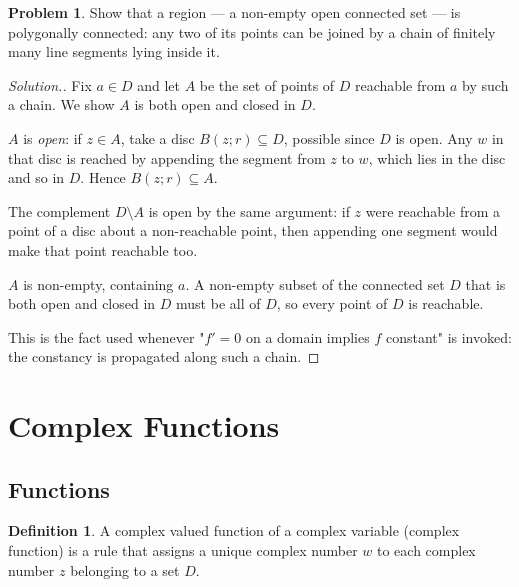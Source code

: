\documentclass[11pt,a4paper]{article}
\theoremstyle{definition}
\newtheorem{definition}[thm]{Definition}
\newtheorem{problemx}{Problem}[section]
\newenvironment{problem}{\begin{problemx}}{\end{problemx}}
\newenvironment{solution}
  {\renewcommand{\qedsymbol}{}\begin{proof}[\textit{Solution}.]}
  {\end{proof}}
\begin{document}
\begin{problem}
Show that a region --- a non-empty open connected set --- is polygonally
connected: any two of its points can be joined by a chain of finitely many
line segments lying inside it.
\end{problem}
\begin{solution}
Fix $a\in D$ and let $A$ be the set of points of $D$ reachable from $a$ by such
a chain. We show $A$ is both open and closed in $D$.

$A$ is \emph{open}: if $z\in A$, take a disc $B(z;r)\subseteq D$, possible since
$D$ is open. Any $w$ in that disc is reached by appending the segment from $z$
to $w$, which lies in the disc and so in $D$. Hence $B(z;r)\subseteq A$.

The complement $D\setminus A$ is open by the same argument: if $z$ were
reachable from a point of a disc about a non-reachable point, then appending one
segment would make that point reachable too.

$A$ is non-empty, containing $a$. A non-empty subset of the connected set $D$
that is both open and closed in $D$ must be all of $D$, so every point of $D$
is reachable.

This is the fact used whenever "$f'=0$ on a domain implies $f$ constant" is
invoked: the constancy is propagated along such a chain.
\end{solution}


















{\color[wave]{485}\section{Complex Functions}}

{\color[wave]{485}\subsection{Functions}}

\begin{definition}
A complex  valued function of a complex variable (complex function) is a rule that assigns a unique complex number $w$ to each complex number $z$ belonging to a set $D$.
\end{definition}
\end{document}
